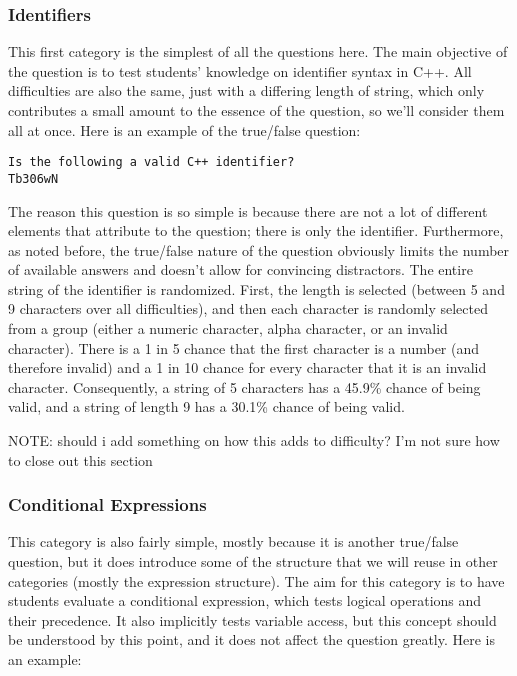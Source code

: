 \documentclass{article}
\begin{document}
\subsubsection{Identifiers}

This first category is the simplest of all the questions here. The main objective of the question is to test students' knowledge on identifier syntax in C++.
All difficulties are also the same, just with a differing length of string, which only contributes a small amount to the essence of the question, so we'll consider
them all at once.
Here is an example of the true/false question:
\begin{Verbatim}
Is the following a valid C++ identifier?
Tb306wN 
\end{Verbatim}

The reason this question is so simple is because there are not a lot of different elements that attribute to the question; there is only the identifier.
Furthermore, as noted before, the true/false nature of the question obviously limits the number of available answers and doesn't allow for convincing distractors.
The entire string of the identifier is randomized. First, the length is selected (between 5 and 9 characters over all difficulties), and then each character is randomly selected from
a group (either a numeric character, alpha character, or an invalid character). There is a 1 in 5 chance that the first character is a number (and therefore invalid)
and a 1 in 10 chance for every character that it is an invalid character. Consequently, a string of 5 characters has a 45.9\% chance of being valid, and a string of
length 9 has a 30.1\% chance of being valid.

NOTE: should i add something on how this adds to difficulty? I'm not sure how to close out this section

\subsubsection{Conditional Expressions}
This category is also fairly simple, mostly because it is another true/false question, but it does introduce some of the structure that we will reuse in other
categories (mostly the expression structure). The aim for this category is to have students evaluate a conditional expression, which tests logical operations
and their precedence. It also implicitly tests variable access, but this concept should be understood by this point, and it does not affect the question greatly.
Here is an example:
\end{document}
